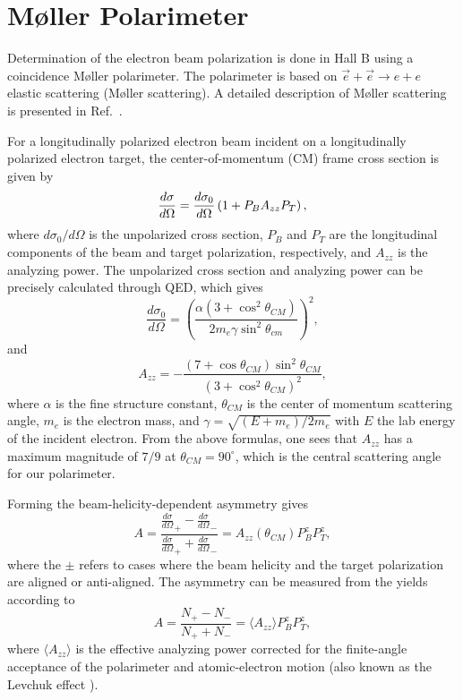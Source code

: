 \section{M{\o}ller Polarimeter}
\label{mollerpol}

Determination of the electron beam polarization is done in Hall B using a coincidence M{\o}ller polarimeter.  The polarimeter is based 
on ${\vec e} + {\vec e}\rightarrow e + e$  elastic scattering (M{\o}ller scattering).  A detailed description of M{\o}ller scattering is presented 
in Ref.~\cite{Wagner:1990sn}.  

For a longitudinally polarized electron beam incident on a longitudinally polarized electron target, the 
center-of-momentum (CM) frame cross section is given by \cite{moller32,kresnin57}
\begin{equation}
\label{eq-csec}
 {{d\sigma}\over{d\Omega}}=
  {{d\sigma_0}\over{d\Omega}}\left(1+P_BA_{zz}P_T\right),
\end{equation}
where $d\sigma_0/d\Omega$ is the unpolarized cross section, $P_B$ and $P_T$ are the longitudinal components of the beam and target polarization, respectively, and $A_{zz}$ is the analyzing power.
The unpolarized cross section and analyzing power can be precisely calculated through QED, which gives
%
\begin{equation}
\label{eq-csecCM}
	\frac{d\sigma_0}{d\Omega}=\left(\frac{\alpha\left(3+\cos^2\theta_{CM}\right)}
						{2m_e\gamma\sin^2\theta_{cm}}\right)^2,
\end{equation}
%
and 
\begin{equation}
\label{eq-Azz}
	A_{zz}=-\frac{\left(7+\cos\theta_{CM}\right)\sin^2\theta_{CM}}{\left(3+\cos^2\theta_{CM}\right)^2},
\end{equation}
%
where $\alpha$ is the fine structure constant, $\theta_{CM}$ is the center of momentum scattering angle, $m_e$ is the electron mass, and
$\gamma=\sqrt{\left(E+m_e\right)/2m_e}$ with $E$ the lab energy of the incident electron.
From the above formulas, one sees that $A_{zz}$ has a maximum magnitude of $7/9$ at $\theta_{CM}=90^\circ$, which is the central scattering
angle for our polarimeter.

Forming the beam-helicity-dependent asymmetry gives
\begin{equation}
\label{eq-asymm}
	A=\frac{\frac{d\sigma}{d\Omega}_+-\frac{d\sigma}{d\Omega}_-}{\frac{d\sigma}{d\Omega}_++\frac{d\sigma}{d\Omega}_-}
	=A_{zz}\left(\theta_{CM}\right)P_B^zP_T^z,
\end{equation}
where the $\pm$ refers to cases where the beam helicity and the target polarization are aligned or anti-aligned.
The asymmetry can be measured from the yields according to
%
\begin{equation}
\label{eq-asymm-meas}
	A=\frac{N_+-N_-}{N_++N_-}=\langle A_{zz}\rangle P_B^zP_T^z,
\end{equation}
%
where $\langle A_{zz}\rangle$ is the effective analyzing power corrected for the finite-angle acceptance of the polarimeter and atomic-electron
motion (also known as the Levchuk effect \cite{levchuk94}).


